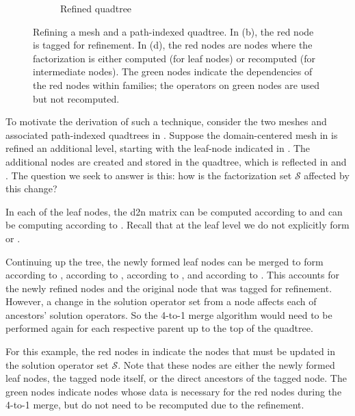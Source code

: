 \begin{figure}[t]
\begin{subfigure}[t]{0.55\textwidth}
        \caption{Refined quadtree}
        \label{fig:adaptive-tree-rebuild-01}
    \end{subfigure}
    \caption{Refining a mesh and a path-indexed quadtree. In (b), the red node is tagged for refinement. In (d), the red nodes are nodes where the factorization is either computed (for leaf nodes) or recomputed (for intermediate nodes). The green nodes indicate the dependencies of the red nodes within families; the operators on green nodes are used but not recomputed.}
    \label{fig:adaptive-mesh-rebuild}
\end{figure}

To motivate the derivation of such a technique, consider the two meshes and associated path-indexed quadtrees in . Suppose the domain-centered mesh in  is refined an additional level, starting with the leaf-node indicated in . The additional nodes are created and stored in the quadtree, which is reflected in  and . The question we seek to answer is this: how is the factorization set $\mathcal{S}$ affected by this change?

In each of the leaf nodes, the \gls{d2n} matrix \Ttau can be computed according to  and \htau can be computing according to . Recall that at the leaf level we do not explicitly form \Stau or \wtau.

Continuing up the tree, the newly formed leaf nodes can be merged to form \Ttau according to , \Stau according to , \htau according to , and \wtau according to . This accounts for the newly refined nodes and the original node that was tagged for refinement. However, a change in the solution operator set from a node affects each of ancestors' solution operators. So the 4-to-1 merge algorithm would need to be performed again for each respective parent up to the top of the quadtree.

For this example, the red nodes in  indicate the nodes that must be updated in the solution operator set $\mathcal{S}$. Note that these nodes are either the newly formed leaf nodes, the tagged node itself, or the direct ancestors of the tagged node. The green nodes indicate nodes whose data is necessary for the red nodes during the 4-to-1 merge, but do not need to be recomputed due to the refinement.

